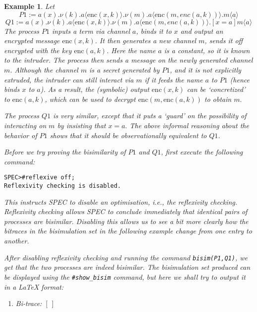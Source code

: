 \documentclass{article}
\newenvironment{example}{\begin{exa} \rm}{\end{exa}}
\newtheorem{exa}[theorem]{Example}
\begin{document}
\begin{example}
Let 
$$
P1   := a(x).\nu (k).a\langle \mathrm{enc}(x,k) \rangle. \nu (m).a\langle \mathrm{enc}(m,enc(a,k)) \rangle.m\langle a \rangle
$$
$$
Q1   := a(x).\nu (k).a\langle \mathrm{enc}(x,k) \rangle. \nu (m).a\langle \mathrm{enc}(m,enc(a,k)) \rangle.[x = a] m \langle a \rangle
$$
The process $P1$ inputs a term via channel $a$, binds it to $x$ and output
an encrypted message $\mathrm{enc}(x,k)$. It then generates a new channel $m$,
sends it off encrypted with the key $\mathrm{enc}(a,k)$. Here the name $a$ is a constant,
so it is known to the intruder. The process then sends a message on the newly generated
channel $m$. Although the channel $m$ is a secret generated by $P1$, and it is not
explicitly extruded, the intruder can still interact via $m$ if it feeds the name $a$
to $P1$ (hence binds $x$ to $a$). As a result, the (symbolic) output $\mathrm{enc}(x,k)$
can be `concretized' to $\mathrm{enc}(a,k)$, which can be used to decrypt 
$\mathrm{enc}(m, \mathrm{enc}(a,k))$ to obtain $m.$

The process $Q1$ is very similar, except that it puts a `guard' on the possibility of interacting
on $m$ by insisting that $x = a.$ The above informal reasoning about the behavior of $P1$
shows that it should be observationally equivalent to $Q1$. 

Before we try proving the bisimilarity of $P1$ and $Q1$, first execute the following command:
\begin{verbatim}
SPEC>#reflexive off; 
Reflexivity checking is disabled.
\end{verbatim}
This instructs SPEC to disable an optimisation, i.e., the reflexivity checking.
Reflexivity checking allows SPEC to conclude immediately that identical pairs of processes
are bisimilar. Disabling this allows us to see a bit more clearly how the bitraces
in the bisimulation set in the following example change from one entry to another. 

After disabling reflexivity checking 
and running the command \texttt{bisim(P1,Q1)}, we get that the two processes are indeed bisimilar.
The bisimulation set produced can be displayed using the \texttt{\#show\_bisim} command, but here
we shall try to output it in a LaTeX format:
\begin{enumerate} 
\item 
Bi-trace: 
$[~]$


\end{enumerate}
\end{example}
\end{document}
